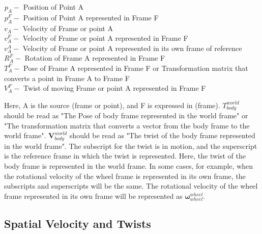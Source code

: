 \documentclass[report.tex]{subfiles}
\begin{document}
        \begin{flushleft}
            
            ${}^{}p_{A}^{} - $ Position of Point A \\
            ${}^{}p_{A}^{F} - $ Position of Point A represented in Frame F \\
            
            $v_{A}^{} - $ Velocity of Frame or point A  \\
            $v_{A}^{F} - $ Velocity of Frame or point A represented in Frame F \\
            $v_{A}^{A} - $ Velocity of Frame or point A represented in its own frame of reference \\

            $R_{A}^{F} - $ Rotation of Frame A represented in Frame F \\
            $T_{A}^{F} - $ Pose of Frame A represented in Frame F or Transformation matrix that converts a point in Frame A to Frame F\\
            $ V_{A}^{F} - $ Twist of moving Frame or point A represented in Frame F \\
                    
        \end{flushleft}
        
    Here, A is the source (frame or point), and F is expressed in (frame). $T_{body}^{world}$ should be read as "The Pose of body frame represented in the world frame" or "The transformation matrix that converts a vector from the body frame to the world frame". $\boldsymbol{V}_{body}^{world}$ should be read as "The twist of the body frame represented in the world frame". The subscript for the twist is in motion, and the superscript is the reference frame in which the twist is represented. Here, the twist of the body frame is represented in the world frame. In some cases, for example, when the rotational velocity of the wheel frame is represented in its own frame, the subscripts and superscripts will be the same. The rotational velocity of the wheel frame represented in its own frame will be represented as $\boldsymbol{\omega}_{wheel}^{wheel}$. 
\subsection{Spatial Velocity and Twists}
\label{subsec:background_twists}

\end{document}
